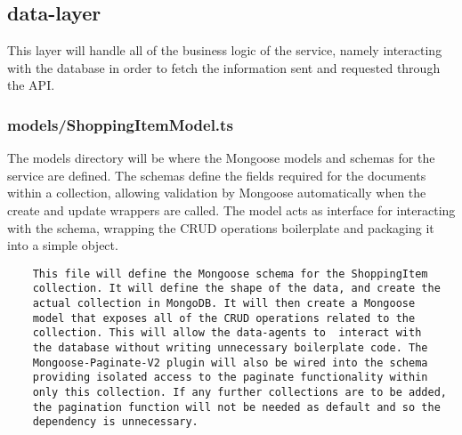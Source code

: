 \subsection{data-layer}
This layer will handle all of the business logic of the service, namely interacting with the database in order to fetch the information sent and requested through the API.
\subsubsection{models/ShoppingItemModel.ts}
The models directory will be where the Mongoose models and schemas for the service are defined. The schemas define the fields required for the documents within a collection, allowing validation by Mongoose automatically when the create and update wrappers are called. The model acts as interface for interacting with the schema, wrapping the CRUD operations boilerplate and packaging it into a simple object.  
\begin{verbatim}
    This file will define the Mongoose schema for the ShoppingItem 
    collection. It will define the shape of the data, and create the
    actual collection in MongoDB. It will then create a Mongoose 
    model that exposes all of the CRUD operations related to the 
    collection. This will allow the data-agents to  interact with
    the database without writing unnecessary boilerplate code. The
    Mongoose-Paginate-V2 plugin will also be wired into the schema 
    providing isolated access to the paginate functionality within
    only this collection. If any further collections are to be added,
    the pagination function will not be needed as default and so the
    dependency is unnecessary.
\end{verbatim}
